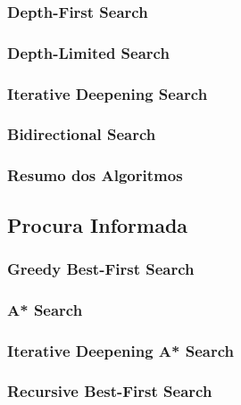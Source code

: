 \documentclass[12pt]{article}
\begin{document}
\subsubsection{Depth-First Search}



\subsubsection{Depth-Limited Search}



\subsubsection{Iterative Deepening Search}



\subsubsection{Bidirectional Search}



\subsubsection*{Resumo dos Algoritmos}



\newpage

\subsection{Procura Informada}



\subsubsection{Greedy Best-First Search}



\subsubsection{A* Search}



\subsubsection{Iterative Deepening A* Search}



\subsubsection{Recursive Best-First Search}
\end{document}

